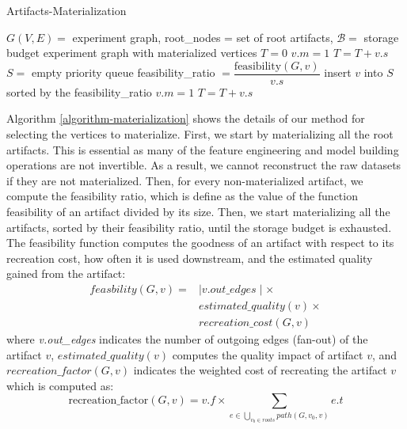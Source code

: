 \begin{algorithm}[h]
\caption{Artifacts-Materialization}\label{algorithm-materialization}
\begin{algorithmic}[1]
\Require  $G(V,E)=$ experiment graph, root\_nodes = set of root artifacts, $\mathcal{B}=$ storage budget
\Ensure experiment graph with materialized vertices
\State $T= 0$ 
 
		\State $v.m = 1$
		\State $T = T + v.s$
	\EndIf
\EndFor
\State $S = $ empty priority queue
		\State feasibility\_ratio $= \dfrac{\text{feasibility}(G, v)}{v.s}$
		\State insert $v$ into $S$ sorted by the feasibility\_ratio
	\EndIf
\EndFor
{}
		\State $v.m = 1$
		\State $T = T + v.s$		
	\EndIf
\EndFor
\end{algorithmic}
\end{algorithm}
Algorithm \ref{algorithm-materialization} shows the details of our method for selecting the vertices to materialize.
First, we start by materializing all the root artifacts.
This is essential as many of the feature engineering and model building operations are not invertible.
As a result, we cannot reconstruct the raw datasets if they are not materialized.
Then, for every non-materialized artifact, we compute the feasibility ratio, which is define as the value of the function feasibility of an artifact divided by its size.
Then, we start materializing all the artifacts, sorted by their feasibility ratio, until the storage budget is exhausted.
The feasibility function computes the goodness of an artifact with respect to its recreation cost, how often it is used downstream, and the estimated quality gained from the artifact:
\begin{equation}
\begin{split}
feasbility(G,v) = 	& \mid v.out\_edges \mid \times\\
								&	estimated\_quality(v) \times \\
								& recreation\_cost(G,v)  
 \end{split}
\end{equation}
where \textit{\mid v.out\_edges \mid} indicates the number of outgoing edges (fan-out) of the artifact $v$, $estimated\_quality(v)$ computes the quality impact of artifact $v$, and $recreation\_factor(G,v)$ indicates the weighted cost of recreating the artifact $v$ which is computed as:
\[
\text{recreation\_factor}(G,v) = v.f \times \sum\limits_{e \in \bigcup\limits_{v_{0}\in roots} path(G, v_{0}, v)} e.t\]
